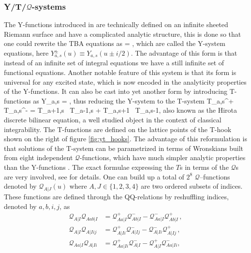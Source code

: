 \subsubsection{Y/T/$\mathcal{Q}$-systems}

The Y-functions introduced in  are technically defined on an infinite sheeted Riemann surface and have a complicated analytic structure, this is done so that one could rewrite the TBA equations as \cite{Gromov:2009bc, Cavaglia:2010nm}
\beq
	\label{eq:ysystem}
	 = ,
\eeq
which are called the Y-system equations, here $Y^\pm_{a,s}(u) \equiv Y_{a,s}(u \pm i/2)$.
The advantage of this form is that instead of an infinite set of integral equations we have a still infinite set of functional equations.
Another notable feature of this system is that its form is universal for any excited state, which is now encoded in the analyticity properties of the Y-functions. 
It can also be cast into yet another form by introducing T-functions as
\beq
	\label{eq:tyrelation}
	Y_{a,s} = ,
\eeq
thus reducing the Y-system to the T-system
\beq
	\label{eq:tsystem}
	T_{a,s}^+ \, T_{a,s}^- = T_{a+1,s} \, T_{a-1,s} + T_{a,s+1} \,  T_{a,s-1},
\eeq
also known as the Hirota discrete bilinear equation, a well studied object in the context of classical integrability.
The T-functions are defined on the lattice points of the T-hook shown on the right of figure \ref{fig:yt_hooks}.
The advantage of this reformulation is that solutions of the T-system can be parametrized in terms of Wronskians built from eight independent $\mathcal{Q}$-functions, which have much simpler analytic properties than the Y-functions \cite{Gromov:2010km}. 
The exact formulae expressing the $T$s in terms of the $\mathcal{Q}$s are very involved, see \cite{Gromov:2010km} for details.
One can build up a total of $2^8$ $\mathcal{Q}$--functions denoted by $\mathcal{Q}_{A|J}(u)$ where $A,J \in \{1,2,3,4\}$ are two ordered subsets of indices.
These functions are defined through the QQ-relations by reshuffling indices, denoted by $a, b, i, j$, as
\begin{subequations}\label{definingQQ}
    \begin{align}
       \label{QQbb}
       \mathcal{Q}_{A|I}\mathcal{Q}_{A ab|I} &=\mathcal{Q}_{A a|I}^{+} \mathcal{Q}_{A b|I}^{-}-
       \mathcal{Q}_{A a|I}^{-}
       \mathcal{Q}_{A b|I}^{+}\,,\\
       \label{QQff}
       \mathcal{Q}_{A|I}\mathcal{Q}_{A|I ij} &=\mathcal{Q}_{A|I i}^{+} \mathcal{Q}_{A|I j}^{-}-
       \mathcal{Q}_{A|I i}^{-} \mathcal{Q}_{A|I j}^{+}\,,\\
       \label{QQbf}
       \mathcal{Q}_{A a|I}\mathcal{Q}_{A|I i} &= \mathcal{Q}_{A a|I i}^{+}\mathcal{Q}_{A|I}^{-}-
       \mathcal{Q}_{A|I}^{+} \mathcal{Q}_{A a|I i}^{-}, \,
     \end{align}
\end{subequations} 
